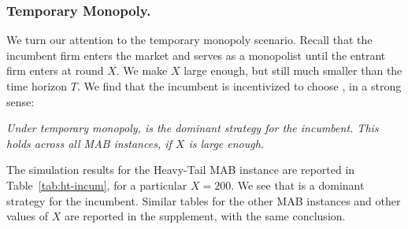 \documentclass[../competing_bandits_with_appendix.tex]{subfiles}
\begin{document}
\subsubsection{Temporary Monopoly.}
We turn our attention to the temporary monopoly scenario. Recall that the incumbent firm enters the market and serves as a monopolist until the entrant firm enters at round $X$. We make $X$ large enough, but still much smaller than the time horizon $T$. We find that the incumbent is incentivized to choose \TS, in a strong sense:

\begin{finding}\label{find:temp-monopoly}
\textit{Under temporary monopoly, \TS is the dominant strategy for the incumbent. This holds across all MAB instances, if $X$ is large enough.
}
\end{finding}

The simulation results for the Heavy-Tail MAB instance are reported in Table~\ref{tab:ht-incum}, for a particular $X=200$. We see that \TS is a dominant strategy for the incumbent. Similar tables for the other MAB instances and other values of $X$ are reported in the supplement, with the same conclusion.
\end{document}
